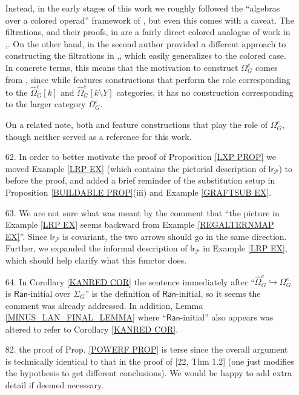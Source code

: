 \documentclass{article}
\begin{document}
\begin{itemize}
	Instead, in the early stages of this work 
	we roughly followed the ``algebras over a colored operad'' framework of \cite{WY18},
	but even this comes with a caveat.
	The filtrations, and their proofs, in \cite{WY18}
	are a fairly direct colored analogue
	of work in \cite{Ha10},\cite{Ha09}.
	On the other hand, in \cite{Pe16}
	the second author provided a different approach to constructing the filtrations in \cite{Ha10},\cite{Ha09},
	which easily generalizes to the colored case.
	In concrete terms,
	this means that the motivation to construct 
	$\Omega^e_G$ comes from \cite{Pe16},
	since while \cite{WY18}
	features constructions that perform the role
	corresponding to 
	the $\widehat{\Omega}^e_G[k]$ 
	and $\widehat{\Omega}^e_G[k \setminus Y]$
	categories,
	it has no construction corresponding to the larger category $\Omega^e_G$. 
	
	On a related note, both 
	\cite{BB17} and \cite[App. C]{Cav}
	feature constructions that play the role of $\Omega^e_G$,
	though neither served as a reference for this work.



	\item[62.] 
	In order to better motivate the proof of 
	Proposition \ref{LXP PROP}
	we moved Example \ref{LRP EX}
	(which contains the pictorial description of $\mathsf{lr}_{\mathcal{P}}$) to before the proof,
	and added a brief reminder of the substitution setup in 
	Proposition \ref{BUILDABLE PROP}(iii)
	and Example \ref{GRAFTSUB EX}.

	\item[63.]
	We are not sure what was meant by the comment that
	``the picture in Example \ref{LRP EX} seems backward from
	Example \ref{REGALTERNMAP EX}''.
	Since $\mathsf{lr}_{\mathcal{P}}$
	is covariant, the two arrows should go in the same direction.
	Further, we expanded the informal description
	of $\mathsf{lr}_{\mathcal{P}}$
	in Example \ref{LRP EX},
	which should help clarify what this functor does.
	
	\item[64.]
	In Corollary \ref{KANRED COR} the sentence immediately after ``$\widehat{\Omega}^e_G \hookrightarrow \Omega^e_G$ is
	$\mathsf{Ran}$-initial over $\Sigma_G$''
	is the definition of $\mathsf{Ran}$-initial,
	so it seems the comment was already addressed.
	In addition, Lemma \ref{MINUS_LAN_FINAL_LEMMA} where ``$\mathsf{Ran}$-initial'' also appears was altered to refer to Corollary \ref{KANRED COR}.
	\item[82.] the proof of Prop. \ref{POWERF PROP} is terse since the overall argument is technically identical to that in the proof of [22, Thm 1.2] (one just modifies the hypothesis to get different conclusions).
	We would be happy to add extra detail if deemed necessary. 


\end{itemize}
\end{document}
